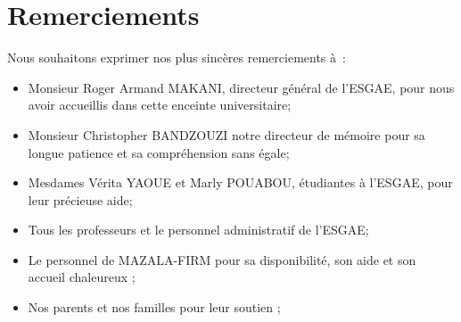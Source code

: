 \chapter*{Remerciements}

Nous souhaitons exprimer nos plus sincères remerciements à :

\begin{itemize}
  \item Monsieur Roger Armand MAKANI, directeur général de l’ESGAE,
      pour nous avoir accueillis dans cette enceinte universitaire;

  \item Monsieur Christopher BANDZOUZI notre directeur de mémoire pour sa
      longue patience et sa compréhension sans égale;

  \item Mesdames Vérita YAOUE et Marly POUABOU, étudiantes à l’ESGAE, pour
      leur précieuse aide;

  \item Tous les professeurs et le personnel administratif de l’ESGAE;


  \item
      Le personnel de MAZALA-FIRM pour sa disponibilité, son aide et son
      accueil chaleureux ;

  \item
      Nos parents et nos familles pour leur soutien ;

\end{itemize}
